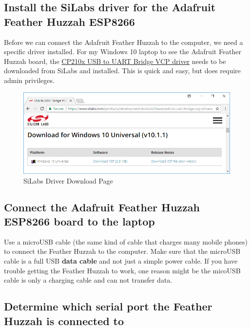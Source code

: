 \documentclass{book}
\makeatletter
\def\maxwidth{\ifdim\Gin@nat@width>\linewidth\linewidth
    \else\Gin@nat@width\fi}
\let\Oldincludegraphics\includegraphics
\renewcommand{\includegraphics}[1]{\Oldincludegraphics[width=.8\maxwidth]{#1}}
\makeatother
\begin{document}
    \subsection{Install the SiLabs driver for the Adafruit Feather Huzzah
ESP8266}\label{install-the-silabs-driver-for-the-adafruit-feather-huzzah-esp8266}

    Before we can connect the Adafruit Feather Huzzah to the computer, we
need a specific driver installed. For my Windows 10 laptop to see the
Adafruit Feather Huzzah board, the
\href{https://www.silabs.com/products/development-tools/software/usb-to-uart-bridge-vcp-drivers}{CP210x
USB to UART Bridge VCP driver} needs to be downloaded from SiLabs and
installed. This is quick and easy, but does require admin privileges.

\begin{figure}
\centering
\includegraphics{images/download_silabs_driver.PNG}
\caption{SiLabs Driver Download Page}
\end{figure}

    \subsection{Connect the Adafruit Feather Huzzah ESP8266 board to the
laptop}\label{connect-the-adafruit-feather-huzzah-esp8266-board-to-the-laptop}

    Use a microUSB cable (the same kind of cable that charges many mobile
phones) to connect the Feather Huzzah to the computer. Make sure that
the microUSB cable is a full USB \textbf{data cable} and not just a
simple power cable. If you have trouble getting the Feather Huzzah to
work, one reason might be the micoUSB cable is only a charging cable and
can not transfer data.

    \subsection{Determine which serial port the Feather Huzzah is connected
to}\label{determine-which-serial-port-the-feather-huzzah-is-connected-to}
\end{document}

